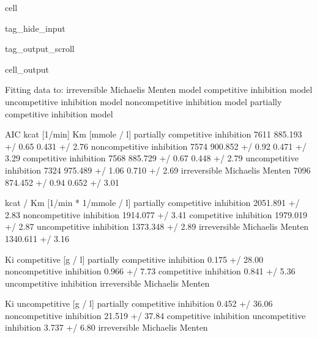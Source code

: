\documentclass[letterpaper,10pt,english]{jupyterBook}
\begin{document}
\begin{sphinxuseclass}{cell}
\begin{sphinxuseclass}{tag_hide_input}
\begin{sphinxuseclass}{tag_output_scroll}
\begin{sphinxVerbatimOutput}
\begin{sphinxuseclass}{cell_output}
\noindent{}

\begin{sphinxVerbatim}[commandchars=\\\{\}]
Fitting data to:
 \PYGZhy{} irreversible Michaelis Menten model
 \PYGZhy{} competitive inhibition model
 \PYGZhy{} uncompetitive inhibition model
 \PYGZhy{} non\PYGZhy{}competitive inhibition model
 \PYGZhy{} partially competitive inhibition model
\end{sphinxVerbatim}

\begin{sphinxVerbatim}[commandchars=\\\{\}]
                                   AIC       kcat [1/min]   Km [mmole / l]  \PYGZbs{}
partially competitive inhibition \PYGZhy{}7611  885.193 +/\PYGZhy{} 0.65\PYGZpc{}  0.431 +/\PYGZhy{} 2.76\PYGZpc{}   
non\PYGZhy{}competitive inhibition       \PYGZhy{}7574  900.852 +/\PYGZhy{} 0.92\PYGZpc{}  0.471 +/\PYGZhy{} 3.29\PYGZpc{}   
competitive inhibition           \PYGZhy{}7568  885.729 +/\PYGZhy{} 0.67\PYGZpc{}  0.448 +/\PYGZhy{} 2.79\PYGZpc{}   
uncompetitive inhibition         \PYGZhy{}7324  975.489 +/\PYGZhy{} 1.06\PYGZpc{}  0.710 +/\PYGZhy{} 2.69\PYGZpc{}   
irreversible Michaelis Menten    \PYGZhy{}7096  874.452 +/\PYGZhy{} 0.94\PYGZpc{}  0.652 +/\PYGZhy{} 3.01\PYGZpc{}   

                                 kcat / Km [1/min * 1/mmole / l]  \PYGZbs{}
partially competitive inhibition              2051.891 +/\PYGZhy{} 2.83\PYGZpc{}   
non\PYGZhy{}competitive inhibition                    1914.077 +/\PYGZhy{} 3.41\PYGZpc{}   
competitive inhibition                        1979.019 +/\PYGZhy{} 2.87\PYGZpc{}   
uncompetitive inhibition                      1373.348 +/\PYGZhy{} 2.89\PYGZpc{}   
irreversible Michaelis Menten                 1340.611 +/\PYGZhy{} 3.16\PYGZpc{}   

                                 Ki competitive [g / l]  \PYGZbs{}
partially competitive inhibition       0.175 +/\PYGZhy{} 28.00\PYGZpc{}   
non\PYGZhy{}competitive inhibition              0.966 +/\PYGZhy{} 7.73\PYGZpc{}   
competitive inhibition                  0.841 +/\PYGZhy{} 5.36\PYGZpc{}   
uncompetitive inhibition                              \PYGZhy{}   
irreversible Michaelis Menten                         \PYGZhy{}   

                                 Ki uncompetitive [g / l]  
partially competitive inhibition         0.452 +/\PYGZhy{} 36.06\PYGZpc{}  
non\PYGZhy{}competitive inhibition              21.519 +/\PYGZhy{} 37.84\PYGZpc{}  
competitive inhibition                                  \PYGZhy{}  
uncompetitive inhibition                  3.737 +/\PYGZhy{} 6.80\PYGZpc{}  
irreversible Michaelis Menten                           \PYGZhy{}  
\end{sphinxVerbatim}


\end{sphinxuseclass}
\end{sphinxVerbatimOutput}
\end{sphinxuseclass}
\end{sphinxuseclass}
\end{sphinxuseclass}
\end{document}
